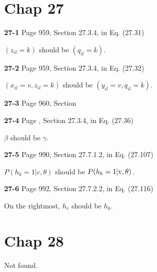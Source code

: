 \documentclass[aps,preprint,a4]{revtex4-1}
\begin{document}



\section{Chap 27}
{\color{red}\textbf{27-1}} Page 959, Section 27.3.4, in Eq. (27.31)

$(z_{il}=k)$ should be $(q_{il}=k)$.

{\color{red}\textbf{27-2}} Page 959, Section 27.3.4, in Eq. (27.32) 

$(x_{il}=v, z_{il}=k)$ should be $(y_{il}=v, q_{il}=k)$.

{\color{red}\textbf{27-3}} Page 960, Section 

{\color{red}\textbf{27-4}} Page , Section 27.3.4, in Eq. (27.36)

$\beta$ should be $\gamma$.

{\color{red}\textbf{27-5}} Page 990, Section 27.7.1.2, in Eq. (27.107)

$P(h_{k}=1|c,\theta)$ should be $P(h_{k}=1|\rm v,\theta)$.

{\color{red}\textbf{27-6}} Page 992, Section 27.7.2.2, in Eq. (27.116)

On the rightmost, $h_{r}$ should be $h_{k}$.

\section{Chap 28}
Not found.

\end{document}
